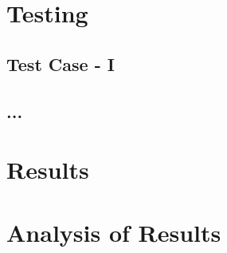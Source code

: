 \section{Testing}
    \subsection{Test Case - I}
    \subsection{...}
    
\section{Results}
\section{Analysis of Results}
